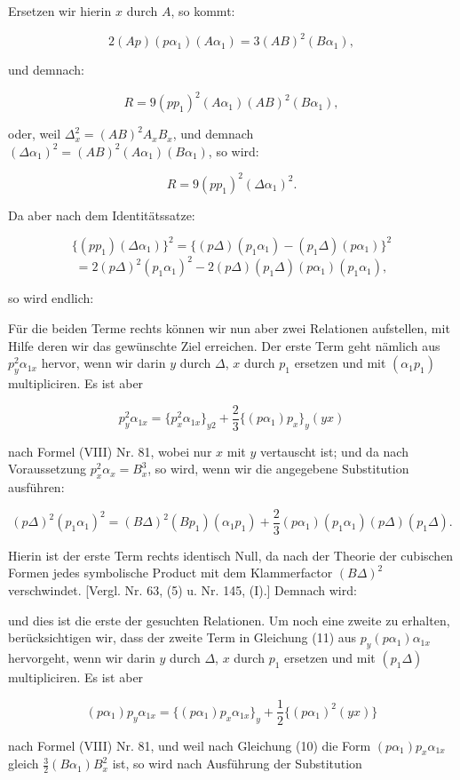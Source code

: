 
Ersetzen wir hierin $x$ durch $A$, so kommt:

\[
2(Ap)(p\alpha_1)(A\alpha_1)=3(AB)^2(B\alpha_1),
\]

und demnach:

\[
R=9(pp_1)^2(A\alpha_1)(AB)^2(B\alpha_1),
\]

oder, weil $\Delta_x^2=(AB)^2A_xB_x$, und demnach $(\Delta\alpha_1)^2=(AB)^2(A\alpha_1)(B\alpha_1)$, so wird:

\[
R=9(pp_1)^2(\Delta\alpha_1)^2.
\]

Da aber nach dem Identitätssatze:

\[
\{(pp_1)(\Delta\alpha_1)\}^2=\{(p\Delta)(p_1\alpha_1)-(p_1\Delta)(p\alpha_1)\}^2
\]
\[
=2(p\Delta)^2(p_1\alpha_1)^2-2(p\Delta)(p_1\Delta)(p\alpha_1)(p_1\alpha_1),
\]

so wird endlich:


Für die beiden Terme rechts können wir nun aber zwei Relationen aufstellen, mit Hilfe deren wir das gewünschte Ziel erreichen. Der erste Term geht nämlich aus $p_y^2\alpha_{1x}$ hervor, wenn wir darin $y$ durch $\Delta$, $x$ durch $p_1$ ersetzen und mit $(\alpha_1p_1)$ multipliciren. Es ist aber

\[
p_y^2\alpha_{1x}=\{p_x^2\alpha_{1x}\}_{y2}+\frac{2}{3}\{(p\alpha_1)p_x\}_y(yx)
\]

nach Formel (VIII) Nr. 81, wobei nur $x$ mit $y$ vertauscht ist; und da nach Voraussetzung $p_x^2\alpha_x=B_x^3$, so wird, wenn wir die angegebene Substitution ausführen:

\[
(p\Delta)^2(p_1\alpha_1)^2=(B\Delta)^2(Bp_1)(\alpha_1p_1)+\frac{2}{3}(p\alpha_1)(p_1\alpha_1)(p\Delta)(p_1\Delta).
\]

Hierin ist der erste Term rechts identisch Null, da nach der Theorie der cubischen Formen jedes symbolische Product mit dem Klammerfactor $(B\Delta)^2$ verschwindet. [Vergl. Nr. 63, (5) u. Nr. 145, (I).] Demnach wird:


und dies ist die erste der gesuchten Relationen. Um noch eine zweite zu erhalten, berücksichtigen wir, dass der zweite Term in Gleichung (11) aus $p_y(p\alpha_1)\alpha_{1x}$ hervorgeht, wenn wir darin $y$ durch $\Delta$, $x$ durch $p_1$ ersetzen und mit $(p_1\Delta)$ multipliciren. Es ist aber

\[
(p\alpha_1)p_y\alpha_{1x}=\{(p\alpha_1)p_x\alpha_{1x}\}_y+\frac{1}{2}\{(p\alpha_1)^2(yx)\}
\]

nach Formel (VIII) Nr. 81, und weil nach Gleichung (10) die Form $(p\alpha_1)p_x\alpha_{1x}$ gleich $\frac{3}{2}(B\alpha_1)B_x^2$ ist, so wird nach Ausführung der Substitution


